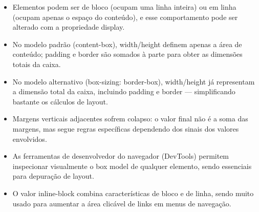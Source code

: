 \begin{itemize}
  \item Elementos podem ser de bloco (ocupam uma linha inteira) ou em linha (ocupam apenas o espaço do conteúdo), e esse comportamento pode ser alterado com a propriedade display.
\end{itemize}

\begin{itemize}
  \item No modelo padrão (content-box), width/height definem apenas a área de conteúdo; padding e border são somados à parte para obter as dimensões totais da caixa.
\end{itemize}

\begin{itemize}
  \item No modelo alternativo (box-sizing: border-box), width/height já representam a dimensão total da caixa, incluindo padding e border — simplificando bastante os cálculos de layout.
\end{itemize}

\begin{itemize}
  \item Margens verticais adjacentes sofrem colapso: o valor final não é a soma das margens, mas segue regras específicas dependendo dos sinais dos valores envolvidos.
\end{itemize}

\begin{itemize}
  \item As ferramentas de desenvolvedor do navegador (DevTools) permitem inspecionar visualmente o box model de qualquer elemento, sendo essenciais para depuração de layout.
\end{itemize}

\begin{itemize}
  \item O valor inline-block combina características de bloco e de linha, sendo muito usado para aumentar a área clicável de links em menus de navegação.
\end{itemize}
